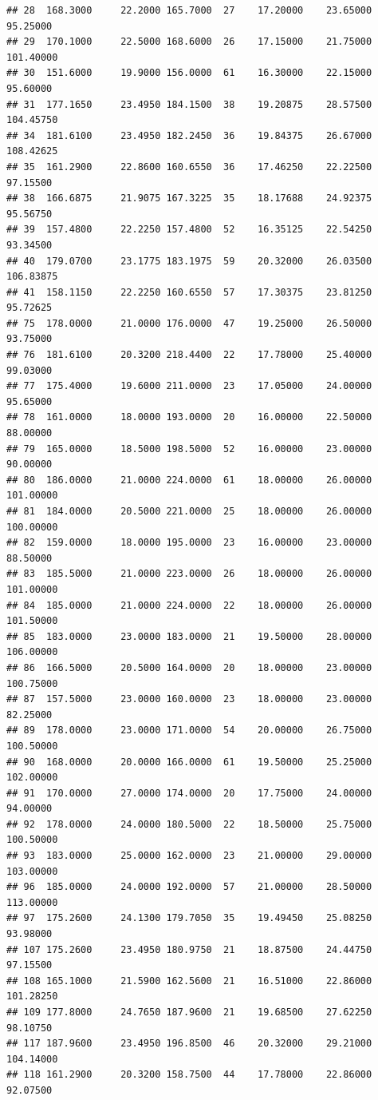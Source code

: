 \documentclass[]{article}
\begin{document}
\begin{verbatim}
## 28  168.3000     22.2000 165.7000  27    17.20000    23.65000  95.25000
## 29  170.1000     22.5000 168.6000  26    17.15000    21.75000 101.40000
## 30  151.6000     19.9000 156.0000  61    16.30000    22.15000  95.60000
## 31  177.1650     23.4950 184.1500  38    19.20875    28.57500 104.45750
## 34  181.6100     23.4950 182.2450  36    19.84375    26.67000 108.42625
## 35  161.2900     22.8600 160.6550  36    17.46250    22.22500  97.15500
## 38  166.6875     21.9075 167.3225  35    18.17688    24.92375  95.56750
## 39  157.4800     22.2250 157.4800  52    16.35125    22.54250  93.34500
## 40  179.0700     23.1775 183.1975  59    20.32000    26.03500 106.83875
## 41  158.1150     22.2250 160.6550  57    17.30375    23.81250  95.72625
## 75  178.0000     21.0000 176.0000  47    19.25000    26.50000  93.75000
## 76  181.6100     20.3200 218.4400  22    17.78000    25.40000  99.03000
## 77  175.4000     19.6000 211.0000  23    17.05000    24.00000  95.65000
## 78  161.0000     18.0000 193.0000  20    16.00000    22.50000  88.00000
## 79  165.0000     18.5000 198.5000  52    16.00000    23.00000  90.00000
## 80  186.0000     21.0000 224.0000  61    18.00000    26.00000 101.00000
## 81  184.0000     20.5000 221.0000  25    18.00000    26.00000 100.00000
## 82  159.0000     18.0000 195.0000  23    16.00000    23.00000  88.50000
## 83  185.5000     21.0000 223.0000  26    18.00000    26.00000 101.00000
## 84  185.0000     21.0000 224.0000  22    18.00000    26.00000 101.50000
## 85  183.0000     23.0000 183.0000  21    19.50000    28.00000 106.00000
## 86  166.5000     20.5000 164.0000  20    18.00000    23.00000 100.75000
## 87  157.5000     23.0000 160.0000  23    18.00000    23.00000  82.25000
## 89  178.0000     23.0000 171.0000  54    20.00000    26.75000 100.50000
## 90  168.0000     20.0000 166.0000  61    19.50000    25.25000 102.00000
## 91  170.0000     27.0000 174.0000  20    17.75000    24.00000  94.00000
## 92  178.0000     24.0000 180.5000  22    18.50000    25.75000 100.50000
## 93  183.0000     25.0000 162.0000  23    21.00000    29.00000 103.00000
## 96  185.0000     24.0000 192.0000  57    21.00000    28.50000 113.00000
## 97  175.2600     24.1300 179.7050  35    19.49450    25.08250  93.98000
## 107 175.2600     23.4950 180.9750  21    18.87500    24.44750  97.15500
## 108 165.1000     21.5900 162.5600  21    16.51000    22.86000 101.28250
## 109 177.8000     24.7650 187.9600  21    19.68500    27.62250  98.10750
## 117 187.9600     23.4950 196.8500  46    20.32000    29.21000 104.14000
## 118 161.2900     20.3200 158.7500  44    17.78000    22.86000  92.07500

\end{verbatim}
\end{document}
